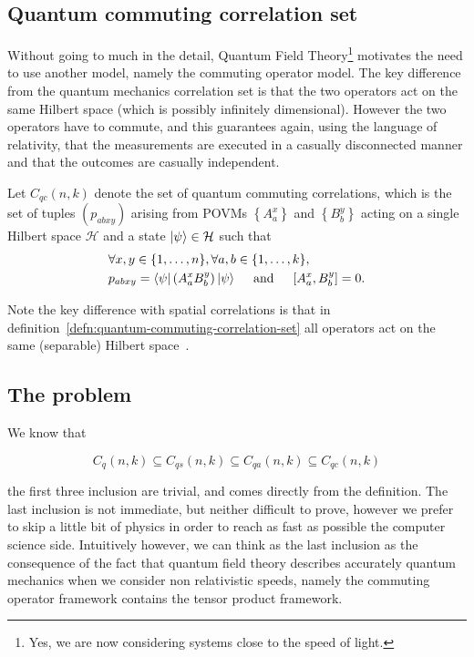 
\subsection{Quantum commuting correlation set}\label{sec:quantum-commuting-correlation-set}
Without going to much in the detail, Quantum Field Theory\footnote{Yes, we are now considering systems close to the speed of light.} motivates the need to use another model, namely the commuting operator model. The key difference from the quantum mechanics correlation set is that the two operators act on the same Hilbert space (which is possibly infinitely dimensional). However the two operators have to commute, and this guarantees again, using the language of relativity, that the measurements are executed in a casually disconnected manner and that the outcomes are casually independent.


\begin{defn}\label{defn:quantum-commuting-correlation-set}
Let $C_{q c}(n, k)$ denote the set of quantum commuting correlations, which is the set of tuples $\left(p_{a b x y}\right)$ arising from POVMs $\left\{A_{a}^{x}\right\}$ and $\left\{B_{b}^{y}\right\}$ acting on a single Hilbert space $\mathcal{H}$ and a state $\ket{\psi} \in \mathcal{H}$ such that
\begin{equation}
    \begin{split}
&\forall x, y \in\{1, \ldots, n\}, \forall a, b \in\{1, \ldots, k\}, \quad \\
 &p_{a b x y}=\bra{\psi}\left(A_{a}^{x} B_{b}^{y}\right) \ket{\psi} \quad \text { and } \quad\left[A_{a}^{x}, B_{b}^{y}\right]=0.
    \end{split}
\end{equation}
\end{defn}
Note the key difference with spatial correlations is that in definition~\ref{defn:quantum-commuting-correlation-set} all operators act on the same (separable) Hilbert space~\cite{mipre}. 

\subsection{The problem}

We know that

\begin{equation}
    C_{q}(n, k) \subseteq C_{q s}(n, k) \subseteq C_{q a}(n, k) \subseteq C_{q c}(n, k)
\end{equation}

the first three inclusion are trivial, and comes directly from the definition. The last inclusion is not immediate, but neither difficult to prove, however we prefer to skip a little bit of physics in order to reach as fast as possible the computer science side. Intuitively however, we can think as the last inclusion as the consequence of the fact that quantum field theory describes accurately quantum mechanics when we consider non relativistic speeds, namely the commuting operator framework contains the tensor product framework.

